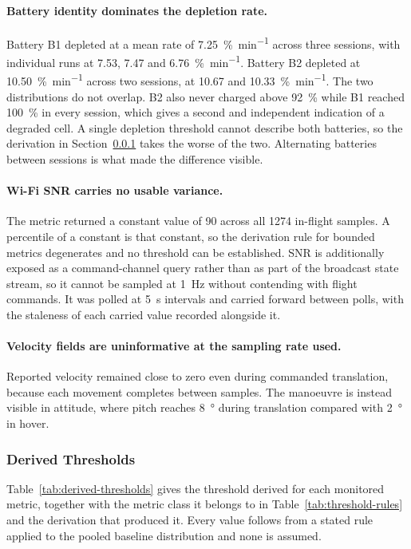 \paragraph{Battery identity dominates the depletion rate.} Battery B1 depleted
at a mean rate of \SI{7.25}{\percent\per\minute} across three sessions, with
individual runs at 7.53, 7.47 and \SI{6.76}{\percent\per\minute}. Battery B2
depleted at \SI{10.50}{\percent\per\minute} across two sessions, at 10.67 and
\SI{10.33}{\percent\per\minute}. The two distributions do not overlap. B2 also
never charged above \SI{92}{\percent} while B1 reached \SI{100}{\percent} in
every session, which gives a second and independent indication of a degraded
cell. A single depletion threshold cannot describe both batteries, so the
derivation in Section~\ref{sec:rq2-thresholds} takes the worse of the two.
Alternating batteries between sessions is what made the difference visible.

\paragraph{Wi-Fi SNR carries no usable variance.} The metric returned a constant
value of 90 across all 1274 in-flight samples. A percentile of a constant is
that constant, so the derivation rule for bounded metrics degenerates and no
threshold can be established. SNR is additionally exposed as a command-channel
query rather than as part of the broadcast state stream, so it cannot be sampled
at \SI{1}{\hertz} without contending with flight commands. It was polled at
\SI{5}{\second} intervals and carried forward between polls, with the staleness
of each carried value recorded alongside it.

\paragraph{Velocity fields are uninformative at the sampling rate used.}
Reported velocity remained close to zero even during commanded translation,
because each movement completes between samples. The manoeuvre is instead
visible in attitude, where pitch reaches \SI{8}{\degree} during translation
compared with \SI{2}{\degree} in hover.

\subsubsection{Derived Thresholds}\label{sec:rq2-thresholds}

Table~\ref{tab:derived-thresholds} gives the threshold derived for each
monitored metric, together with the metric class it belongs to in
Table~\ref{tab:threshold-rules} and the derivation that produced it. Every value
follows from a stated rule applied to the pooled baseline distribution and none
is assumed.

